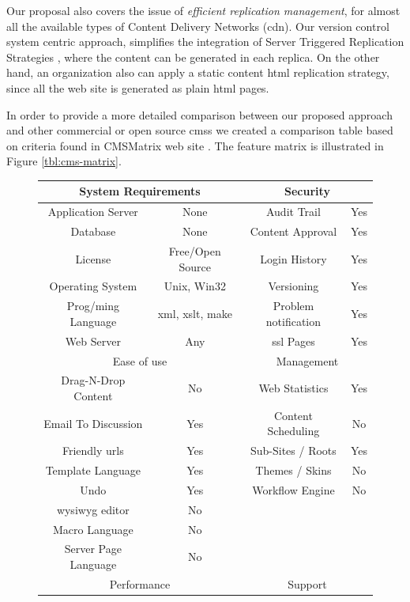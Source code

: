 \documentclass{article}
\begin{document}
Our proposal also covers the issue of \textit{efficient replication
management}, for almost all the available types of Content Delivery
Networks ({\sc cdn}).
Our version control system centric approach, simplifies the integration
of Server Triggered Replication Strategies \cite{SSPS04}, where the
content can be generated in each replica.
On the other hand, an organization also can apply a static content {\sc
html} replication strategy, since all the web site is generated as plain
{\sc html} pages.

In order to provide a more detailed comparison between our proposed approach and other commercial or open source {\sc cms}s we
created a comparison table based on criteria found in CMSMatrix web site \cite{PBC05}. The feature matrix is illustrated in Figure \ref{tbl:cms-matrix}.

\begin{figure}
\begin{center}
\begin{tabular}{c c | c c}
\hline
\multicolumn{2}{c|}{System Requirements} & \multicolumn{2}{c}{Security}\\
\hline
Application Server & None & Audit Trail & Yes\\
Database & None & Content Approval & Yes\\
License & Free/Open Source & Login History & Yes\\
Operating System & Unix, Win32 & Versioning & Yes\\
Prog/ming Language & {\sc xml, xslt}, make & Problem notification & Yes\\
Web Server & Any & {\sc ssl} Pages & Yes\\
\hline
\multicolumn{2}{c|}{Ease of use} & \multicolumn{2}{c}{Management}\\
\hline
Drag-N-Drop Content & No & Web Statistics & Yes\\
Email To Discussion & Yes & Content Scheduling & No\\
Friendly {\sc url}s & Yes & Sub-Sites / Roots & Yes\\
Template Language & Yes & Themes / Skins & No\\
Undo & Yes & Workflow Engine & No\\
{\sc wysiwyg} editor & No & &\\
Macro Language & No & &\\
Server Page Language & No & &\\
\hline
\multicolumn{2}{c|}{Performance} & \multicolumn{2}{c}{Support}\\

\end{tabular}
\end{center}
\end{figure}
\end{document}
